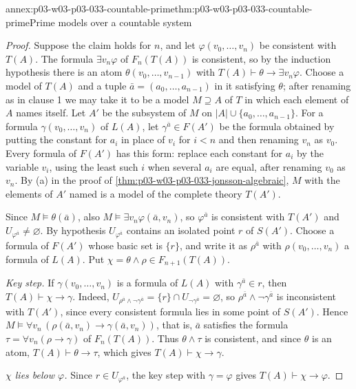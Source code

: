 \begin{annexitem}{annex:p03-w03-p03-033-countable-prime}{thm:p03-w03-p03-033-countable-prime}{Prime models over a countable system}
\begin{proof}
Suppose the claim holds for \(n\), and let
\(\varphi(v_0,\dots,v_n)\) be consistent with \(T(A)\). The formula
\(\exists v_n\varphi\) of \(F_n(T(A))\) is consistent, so by the
induction hypothesis there is an atom \(\theta(v_0,\dots,v_{n-1})\) with
\(T(A)\vdash\theta\to\exists v_n\varphi\). Choose a model of \(T(A)\) and
a tuple \(\bar a=(a_0,\dots,a_{n-1})\) in it satisfying \(\theta\); after
renaming as in clause 1 we may take it to be a model \(M\supseteq A\) of
\(T\) in which each element of \(A\) names itself. Let \(A'\) be the
subsystem of \(M\) on \(|A|\cup\{a_0,\dots,a_{n-1}\}\). For a formula
\(\gamma(v_0,\dots,v_n)\) of \(L(A)\), let \(\gamma^{\bar a}\in F(A')\)
be the formula obtained by putting the constant for \(a_i\) in place of
\(v_i\) for \(i<n\) and then renaming \(v_n\) as \(v_0\). Every formula of
\(F(A')\) has this form: replace each constant for \(a_i\) by the
variable \(v_i\), using the least such \(i\) when several \(a_i\) are
equal, after renaming \(v_0\) as \(v_n\). By (a) in the proof of
\cref{thm:p03-w03-p03-033-jonsson-algebraic}, \(M\) with the elements of
\(A'\) named is a model of the complete theory \(T(A')\).

Since \(M\models\theta(\bar a)\), also \(M\models\exists v_n\varphi(\bar a,v_n)\),
so \(\varphi^{\bar a}\) is consistent with \(T(A')\) and
\(U_{\varphi^{\bar a}}\neq\varnothing\). By hypothesis \(U_{\varphi^{\bar a}}\)
contains an isolated point \(r\) of \(S(A')\). Choose a formula of
\(F(A')\) whose basic set is \(\{r\}\), and write it as \(\rho^{\bar a}\)
with \(\rho(v_0,\dots,v_n)\) a formula of \(L(A)\). Put
\(\chi=\theta\wedge\rho\in F_{n+1}(T(A))\).

\emph{Key step.} If \(\gamma(v_0,\dots,v_n)\) is a formula of \(L(A)\)
with \(\gamma^{\bar a}\in r\), then \(T(A)\vdash\chi\to\gamma\). Indeed,
\(U_{\rho^{\bar a}\wedge\neg\gamma^{\bar a}}=\{r\}\cap
U_{\neg\gamma^{\bar a}}=\varnothing\), so
\(\rho^{\bar a}\wedge\neg\gamma^{\bar a}\) is inconsistent with
\(T(A')\), since every consistent formula lies in some point of
\(S(A')\). Hence \(M\models\forall v_n\,(\rho(\bar a,v_n)\to\gamma(\bar a,v_n))\),
that is, \(\bar a\) satisfies the formula
\(\tau=\forall v_n(\rho\to\gamma)\) of \(F_n(T(A))\). Thus
\(\theta\wedge\tau\) is consistent, and since \(\theta\) is an atom,
\(T(A)\vdash\theta\to\tau\), which gives \(T(A)\vdash\chi\to\gamma\).

\emph{\(\chi\) lies below \(\varphi\).} Since \(r\in U_{\varphi^{\bar a}}\),
the key step with \(\gamma=\varphi\) gives \(T(A)\vdash\chi\to\varphi\).


\end{proof}
\end{annexitem}
